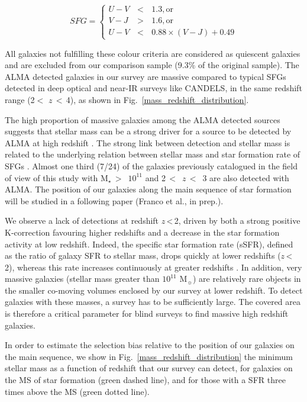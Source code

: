 \documentclass[longauth]{aa}
\begin{document}
\begin{equation}
SFG =
\left\lbrace
\begin{array}{ccc}
U-V  &\,<\, & 1.3, \text{or}\\
V-J &\,>\, & 1.6, \text{or}\\
U-V &\,<\, & 0.88 \times (V-J) + 0.49
\end{array}\right.
\label{SFG_equation}
\end{equation}

\noindent All galaxies not fulfilling these colour criteria are considered as quiescent galaxies and are excluded from our comparison sample (9.3\% of the original sample). The ALMA detected galaxies in our survey are massive compared to typical SFGs detected in deep optical and near-IR surveys like CANDELS, in the same redshift range (2$<$ $z$\,$<$\,4), as shown in Fig.~\ref{mass_redshift_distribution}.

The high proportion of massive galaxies among the ALMA detected sources suggests that stellar mass can be a strong driver for a source to be detected by ALMA at high redshift \citep{Dunlop2017}. The strong link between detection and stellar mass is related to the underlying relation between stellar mass and star formation rate of SFGs \mbox{\citep[e.g.][]{Noeske2007,Elbaz2011}}. Almost one third (7/24) of the galaxies previously catalogued in the field of view of this study with M$_\star$\,$>$\, $10^{11}$ and 2\,$<$\, $z$\,$<$\, 3 are also detected with ALMA. The position of our galaxies along the main sequence of star formation will be studied in a following paper (Franco et al., in prep.).

We observe a lack of detections at redshift $z$\,<\,2, driven by both a strong positive K-correction favouring higher redshifts and a decrease in the star formation activity at low redshift. Indeed, the specific star formation rate (sSFR), defined as the ratio of galaxy SFR to stellar mass, drops quickly at lower redshifts ($z$\,<\,2), whereas this rate increases continuously at greater redshifts \mbox{\citep[e.g.][]{Schreiber2015}}.
In addition, very massive galaxies (stellar mass greater than $10^{11}$ M$_\sun$) are relatively rare objects in the smaller co-moving volumes enclosed by our survey at lower redshift. To detect galaxies with these masses, a survey has to be sufficiently large. The covered area is therefore a critical parameter for blind surveys to find massive high redshift galaxies. 

In order to estimate the selection bias relative to the position of our galaxies on the main sequence, we show in Fig.~\ref{mass_redshift_distribution} the minimum stellar mass as a function of redshift that our survey can detect, for galaxies on the MS of star formation (green dashed line), and for those with a SFR three times above the MS (green dotted line).
\end{document}
